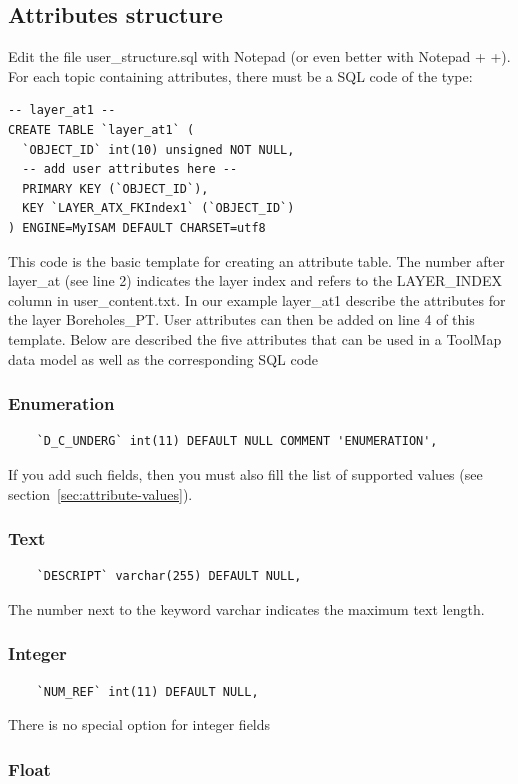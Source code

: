 \documentclass[a4paper, 12pt]{article}
\begin{document}
\subsection{Attributes structure}
Edit the file user\_structure.sql with Notepad (or even better with Notepad + +). For each topic containing attributes, there must be a SQL code of the type:

\begin{lstlisting}
-- layer_at1 --
CREATE TABLE `layer_at1` (
  `OBJECT_ID` int(10) unsigned NOT NULL,
  -- add user attributes here --
  PRIMARY KEY (`OBJECT_ID`),
  KEY `LAYER_ATX_FKIndex1` (`OBJECT_ID`)
) ENGINE=MyISAM DEFAULT CHARSET=utf8
\end{lstlisting}
This code is the basic template for creating an attribute table. The number after layer\_at (see line 2) indicates the layer index and refers to the LAYER\_INDEX column in user\_content.txt. In our example layer\_at1 describe the attributes for the layer Boreholes\_PT. User attributes can then be added on line 4 of this template.
Below are described the five attributes that can be used in a ToolMap data model as well as the corresponding SQL code
\subsubsection {Enumeration} 
    \begin{lstlisting}
    `D_C_UNDERG` int(11) DEFAULT NULL COMMENT 'ENUMERATION',
    \end{lstlisting}
    If you add such fields, then you must also fill the list of supported values (see section~\ref{sec:attribute-values}).
    \subsubsection {Text}
    \begin{lstlisting}
    `DESCRIPT` varchar(255) DEFAULT NULL,
    \end{lstlisting}
    The number next to the keyword varchar indicates the maximum text length. 
    \subsubsection {Integer}
    \begin{lstlisting}
    `NUM_REF` int(11) DEFAULT NULL,       
    \end{lstlisting}
    There is no special option for integer fields
  \subsubsection {Float}
\end{document}
